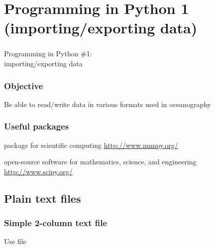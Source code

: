 \section{Programming in Python 1 (importing/exporting data)}

\begin{frame}
\frametitle{}
\huge
Programming in Python \#1:\\
importing/exporting data

\end{frame}

\begin{frame}
\frametitle{Objective}

Be able to read/write data in various formats used in oceanography

\vfill 


\end{frame}

\begin{frame}
\frametitle{Useful packages}

\begin{description}
\item<1->[NumPy:] package for scientific computing \url{http://www.numpy.org/}
\item<2->[SciPy:] open-source software for mathematics, science, and engineering \url{http://www.scipy.org/}

\end{description}
\end{frame}

\subsection{Plain text files}
\begin{frame}[fragile]
\frametitle{Simple 2-column text file}
Use file 

\end{frame}


